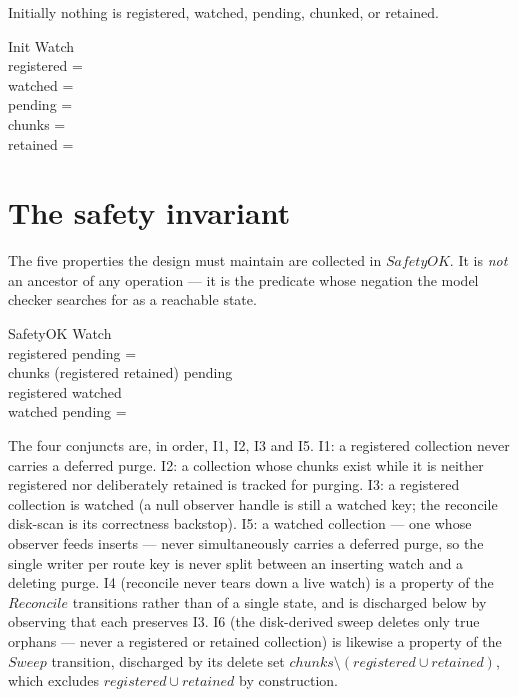 \documentclass[a4paper]{article}
\begin{document}
Initially nothing is registered, watched, pending, chunked, or retained.

\begin{schema}{Init}
  Watch \\
  \where
  registered = \emptyset \\
  watched = \emptyset \\
  pending = \emptyset \\
  chunks = \emptyset \\
  retained = \emptyset
\end{schema}

\section{The safety invariant}

The five properties the design must maintain are collected in $SafetyOK$.  It is
\textit{not} an ancestor of any operation --- it is the predicate whose negation
the model checker searches for as a reachable state.

\begin{schema}{SafetyOK}
  Watch \\
  \where
  registered \cap pending = \emptyset \\
  chunks \setminus (registered \cup retained) \subseteq pending \\
  registered \subseteq watched \\
  watched \cap pending = \emptyset
\end{schema}

The four conjuncts are, in order, I1, I2, I3 and I5.  I1: a registered
collection never carries a deferred purge.  I2: a collection whose chunks exist
while it is neither registered nor deliberately retained is tracked for purging.
I3: a registered collection is watched (a null observer handle is still a
watched key; the reconcile disk-scan is its correctness backstop).  I5: a
watched collection --- one whose observer feeds inserts --- never simultaneously
carries a deferred purge, so the single writer per route key is never split
between an inserting watch and a deleting purge.  I4 (reconcile never tears down
a live watch) is a property of the $Reconcile$ transitions rather than of a
single state, and is discharged below by observing that each preserves I3.
I6 (the disk-derived sweep deletes only true orphans --- never a registered or
retained collection) is likewise a property of the $Sweep$ transition, discharged
by its delete set $chunks \setminus (registered \cup retained)$, which excludes
$registered \cup retained$ by construction.
\end{document}
